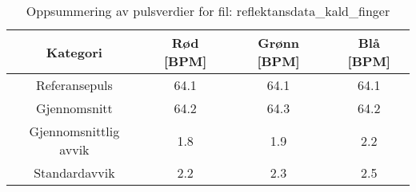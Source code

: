 
\begin{table}[H]
\centering
\caption{Oppsummering av pulsverdier for fil: reflektansdata\_kald\_finger}
\label{tab:reflektansdata\_kald\_finger\_summary}
\begin{tabular}{|c|c|c|c|}
\hline
\textbf{Kategori} & \textbf{Rød [BPM]} & \textbf{Grønn [BPM]} & \textbf{Blå [BPM]} \\ \hline
Referansepuls & 64.1 & 64.1 & 64.1 \\ \hline
Gjennomsnitt & 64.2 & 64.3 & 64.2 \\ \hline
Gjennomsnittlig avvik & 1.8 & 1.9 & 2.2 \\ \hline
Standardavvik & 2.2 & 2.3 & 2.5 \\ \hline
\end{tabular}
\end{table}
